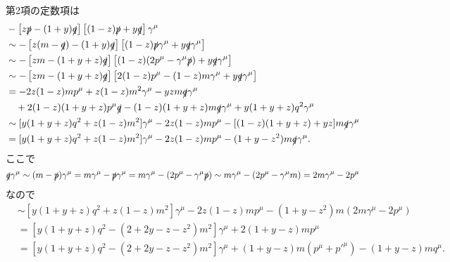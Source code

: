 第2項の定数項は
\begin{align*}
  & - \left[ z \slashed{p} - (1+y) \slashed{q} \right] \left[ (1-z) \slashed{p} + y\slashed{q} \right] \gamma^\mu \\
  &\sim - \left[ z (m-\slashed{q}) - (1+y) \slashed{q} \right] \left[ (1-z) \slashed{p} \gamma^\mu + y\slashed{q} \gamma^\mu \right] \\
  &\sim - \left[ zm - (1+y+z) \slashed{q} \right] \left[ (1-z) (2p^\mu - \gamma^\mu \slashed{p}) + y\slashed{q} \gamma^\mu \right] \\
  &\sim - \left[ zm - (1+y+z) \slashed{q} \right] \left[ 2(1-z)p^\mu - (1-z)m \gamma^\mu + y\slashed{q} \gamma^\mu \right] \\
  &= -2z(1-z)m p^\mu + z(1-z)m^2 \gamma^\mu - yzm \slashed{q} \gamma^\mu \\
  &\quad + 2(1-z)(1+y+z) p^\mu \slashed{q} - (1-z)(1+y+z)m \slashed{q} \gamma^\mu + y (1+y+z) q^2 \gamma^\mu \\
  &\sim [y (1+y+z) q^2 + z(1-z)m^2] \gamma^\mu - 2z(1-z)m p^\mu - [(1-z)(1+y+z) + yz] m \slashed{q} \gamma^\mu \\
  &= [y (1+y+z) q^2 + z(1-z)m^2] \gamma^\mu - 2z(1-z)m p^\mu - (1+y-z^2) m \slashed{q} \gamma^\mu .
\end{align*}
ここで
\[
\slashed{q} \gamma^\mu \sim (m - \slashed{p}) \gamma^\mu = m \gamma^\mu - \slashed{p} \gamma^\mu
= m \gamma^\mu - (2p^\mu - \gamma^\mu \slashed{p}) \sim m \gamma^\mu - (2p^\mu - \gamma^\mu m)
= 2 m \gamma^\mu - 2p^\mu
\]
なので
\begin{align*}
  &\sim [y (1+y+z) q^2 + z(1-z)m^2] \gamma^\mu - 2z(1-z)m p^\mu - (1+y-z^2) m (2 m \gamma^\mu - 2p^\mu) \\
  &= [y (1+y+z) q^2 - (2+2y-z-z^2) m^2] \gamma^\mu + 2(1+y-z) m p^\mu \\
  &= [y (1+y+z) q^2 - (2+2y-z-z^2) m^2] \gamma^\mu + (1+y-z) m (p^\mu+p'^\mu) - (1+y-z)m q^\mu .
\end{align*}

